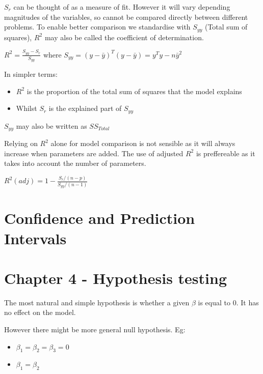 \documentclass[
  letterpaper,
  DIV=11,
  numbers=noendperiod]{scrreprt}
\providecommand{\tightlist}{%
  \setlength{\itemsep}{0pt}\setlength{\parskip}{0pt}}\usepackage{longtable,booktabs,array}
\begin{document}
\(S_r\) can be thought of as a measure of fit. However it will vary
depending magnitudes of the variables, so cannot be compared directly
between different problems. To enable better comparison we standardise
with \(S_{yy}\) (Total sum of squares), \(R^2\) may also be called the
coefficient of determination.

\(R^2 = \frac{S_{yy} - S_r}{S_{yy}}\) where
\(S_{yy} = (y-\bar{y})^T(y-\bar{y}) = y^Ty - n\bar{y}^2\)

In simpler terms:

\begin{itemize}
\tightlist
\item
  \(R^2\) is the proportion of the total sum of squares that the model
  explains
\item
  Whilst \(S_r\) is the explained part of \(S_{yy}\)
\end{itemize}

\(S_{yy}\) may also be written as \(SS_{Total}\)

Relying on \(R^2\) alone for model comparison is not sensible as it will
always increase when parameters are added. The use of adjusted \(R^2\)
is preffereable as it takes into account the number of parameters.

\(R^2(adj) = 1 - \frac{S_r/(n-p)}{S_{yy}/(n-1)}\)

\hypertarget{confidence-and-prediction-intervals}{%
\section{Confidence and Prediction
Intervals}\label{confidence-and-prediction-intervals}}

\hypertarget{chapter-4---hypothesis-testing}{%
\section{Chapter 4 - Hypothesis
testing}\label{chapter-4---hypothesis-testing}}

The most natural and simple hypothesis is whether a given \(\beta\) is
equal to 0. It has no effect on the model.

However there might be more general null hypothesis. Eg:

\begin{itemize}
\tightlist
\item
  \(\beta_1 = \beta_2 = \beta_3 = 0\)
\item
  \(\beta_1 = \beta_2\)
\end{itemize}
\end{document}
